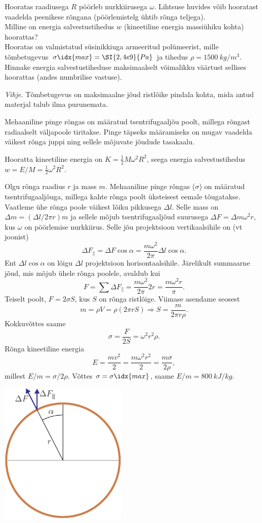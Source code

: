
Hooratas raadiusega $R$ pöörleb nurkkiirusega $\omega$. Lihtsuse huvides võib hooratast vaadelda peenikese rõngana (pöörlemistelg ühtib rõnga teljega).\\
\osa Milline on energia salvestustihedus $w$ (kineetiline energia massiühiku kohta) hoorattas?\\
\osa Hooratas on valmistatud süsinikkiuga armeeritud polümeerist, mille tõmbetugevus $\sigma\idx{max} = \SI{2,4e9}{Pa}$ ja tihedus $\rho = \SI{1500}{kg/m^3}$. Hinnake energia salvestustiheduse maksimaalselt võimalikku väärtust sellises hoorattas (andes numbrilise vastuse).

\emph{Vihje}. Tõmbetugevus on maksimaalne jõud ristlõike pindala kohta, mida antud materjal talub ilma purunemata.

\hint
Mehaaniline pinge rõngas on määratud tsentrifugaaljõu poolt, millega rõngast radiaalselt väljapoole tiritakse. Pinge täpseks määramiseks on mugav vaadelda väikest rõnga juppi ning sellele mõjuvate jõudude tasakaalu.

\solu
\osa Hooratta kineetiline energia on $K = \frac{1}{2}M\omega^2R^2$, seega energia salvestustihedus $w = E/M = \frac{1}{2} \omega^2R^2$.

\osa Olgu rõnga raadius $r$ ja mass $m$. Mehaaniline pinge rõngas ($\sigma$) on määratud tsentrifugaaljõuga, millega kahte rõnga poolt üksteisest eemale tõugatakse. Vaatleme ühe rõnga poole väikest lõiku pikkusega $\Delta l$. Selle mass on $\Delta m = (\Delta l/2\pi r)m$ ja sellele mõjub tsentrifugaaljõud suurusega $\Delta F = \Delta m\omega^2 r$, kus $\omega$ on pöörlemise nurkkiirus. Selle jõu projektsioon vertikaalsihile on (vt joonist)
\[
\Delta F_{ \|}=\Delta F \cos \alpha=\frac{m \omega^{2}}{2 \pi} \Delta l \cos \alpha.
\]
Ent $\Delta l \cos \alpha$ on lõigu $\Delta l$ projektsioon horisontaalsihile. Järelikult summaarne jõud, mis mõjub ühele rõnga poolele, avaldub kui
\[
F=\sum \Delta F_{ \|}=\frac{m \omega^{2}}{2 \pi} 2 r=\frac{m \omega^{2} r}{\pi}.
\]
Teiselt poolt, $F = 2\sigma S$, kus $S$ on rõnga ristlõige. Viimase asendame seosest
\[
m=\rho V=\rho(2 \pi r S) \Rightarrow S=\frac{m}{2 \pi r \rho}.
\]
Kokkuvõttes saame
\[
\sigma = \frac{F}{2S} = \omega^2 r^2 \rho.
\]
Rõnga kineetiline energia
\[
E = \frac{mv^2}{2} = \frac{m\omega^2r^2}{2} = \frac{m\sigma}{2\rho},
\]
millest $E/m = \sigma /2\rho$. Võttes $\sigma = \sigma\idx{max}$, saame $E/m = \SI{800}{kJ/kg}$.

\begin{center}
	\includegraphics[width=0.45\textwidth]{2007-v3g-04-yl}
\end{center}
\probend